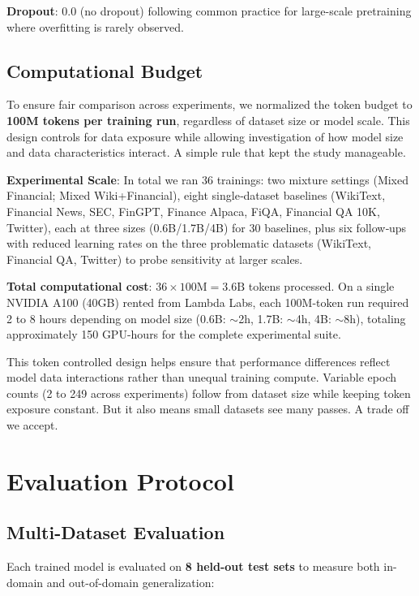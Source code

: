 \textbf{Dropout}: 0.0 (no dropout) following common practice for large-scale pretraining where overfitting is rarely observed.

\subsection{Computational Budget}

To ensure fair comparison across experiments, we normalized the token budget to \textbf{100M tokens per training run}, regardless of dataset size or model scale. This design controls for data exposure while allowing investigation of how model size and data characteristics interact. A simple rule that kept the study manageable.

\textbf{Experimental Scale}: In total we ran 36 trainings: two mixture settings (Mixed Financial; Mixed Wiki+Financial), eight single‑dataset baselines (WikiText, Financial News, SEC, FinGPT, Finance Alpaca, FiQA, Financial QA 10K, Twitter), each at three sizes (0.6B/1.7B/4B) for 30 baselines, plus six follow‑ups with reduced learning rates on the three problematic datasets (WikiText, Financial QA, Twitter) to probe sensitivity at larger scales.

\textbf{Total computational cost}: $36 \times 100\text{M} = 3.6\text{B}$ tokens processed. On a single NVIDIA A100 (40GB) rented from Lambda Labs, each 100M-token run required 2 to 8 hours depending on model size (0.6B: $\sim$2h, 1.7B: $\sim$4h, 4B: $\sim$8h), totaling approximately 150 GPU-hours for the complete experimental suite.

This token controlled design helps ensure that performance differences reflect model data interactions rather than unequal training compute. Variable epoch counts (2 to 249 across experiments) follow from dataset size while keeping token exposure constant. But it also means small datasets see many passes. A trade off we accept.

\section{Evaluation Protocol}

\subsection{Multi-Dataset Evaluation}

Each trained model is evaluated on \textbf{8 held-out test sets} to measure both in-domain and out-of-domain generalization:

